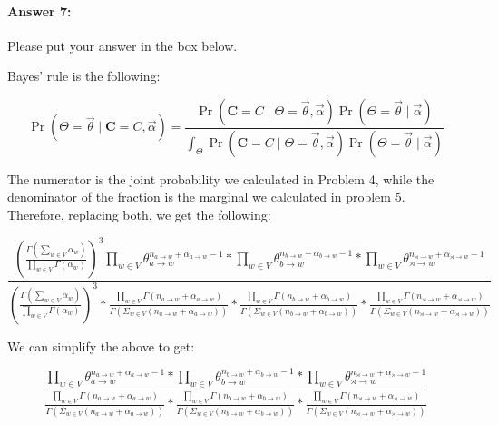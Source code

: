 \documentclass[10pt]{article}
\newenvironment{AnswerBox}{\begin{mdframed}[style=simple]}{\end{mdframed}}
\begin{document}
\paragraph{Answer 7:}  Please put your answer in the box below.


\begin{AnswerBox}%
Bayes' rule is the following:

$$\Pr(\Theta=\vec{\theta} \mid \mathbf{C}=C, \vec{\alpha})=\frac{\Pr(\mathbf{C}=C \mid \Theta=\vec{\theta}, \vec{\alpha})\Pr(\Theta=\vec{\theta}\mid\vec{\alpha})}{\int_{\Theta} \Pr(\mathbf{C}=C \mid \Theta=\vec{\theta},\vec{\alpha})\Pr(\Theta=\vec{\theta}\mid \vec{\alpha})}$$

The numerator is the joint probability we calculated in Problem 4, while the denominator of the fraction is the marginal we calculated in problem 5. Therefore, replacing both, we get the following:

$$
\frac{(\frac{\Gamma(\sum_{w \in V} \alpha_w)}{\prod_{w \in V} \Gamma(\alpha_w)})^3 
\prod _{w \in V} \theta_{a \rightarrow w}^{n_{a \rightarrow w} + \alpha_{a \rightarrow w} -1} *
\prod _{w \in V} \theta_{b \rightarrow w}^{n_{b \rightarrow w} + \alpha_{b \rightarrow w} -1} *
\prod _{w \in V} \theta_{\rtimes \rightarrow w}^{n_{\rtimes \rightarrow w} + \alpha_{\rtimes \rightarrow w} -1}}
{(\frac{\Gamma(\sum_{w \in V} \alpha_w)}{\prod_{w \in V} \Gamma(\alpha_w)})^3 *
\frac{\prod_{w \in V} \Gamma(n_{a \rightarrow w} + \alpha_{a \rightarrow w})}
{\Gamma(\Sigma_{w \in V} (n_{a \rightarrow w} + \alpha_{a \rightarrow w}))} *
\frac{\prod_{w \in V} \Gamma(n_{b \rightarrow w} + \alpha_{b \rightarrow w})}
{\Gamma(\Sigma_{w \in V} (n_{b \rightarrow w} + \alpha_{b \rightarrow w}))} *
\frac{\prod_{w \in V} \Gamma(n_{\rtimes \rightarrow w} + \alpha_{\rtimes \rightarrow w})}
{\Gamma(\Sigma_{w \in V} (n_{\rtimes \rightarrow w} + \alpha_{\rtimes \rightarrow w}))}}
$$

We can simplify the above to get:

$$
\frac{ 
\prod _{w \in V} \theta_{a \rightarrow w}^{n_{a \rightarrow w} + \alpha_{a \rightarrow w} -1} *
\prod _{w \in V} \theta_{b \rightarrow w}^{n_{b \rightarrow w} + \alpha_{b \rightarrow w} -1} *
\prod _{w \in V} \theta_{\rtimes \rightarrow w}^{n_{\rtimes \rightarrow w} + \alpha_{\rtimes \rightarrow w} -1}}
{
\frac{\prod_{w \in V} \Gamma(n_{a \rightarrow w} + \alpha_{a \rightarrow w})}
{\Gamma(\Sigma_{w \in V} (n_{a \rightarrow w} + \alpha_{a \rightarrow w}))} *
\frac{\prod_{w \in V} \Gamma(n_{b \rightarrow w} + \alpha_{b \rightarrow w})}
{\Gamma(\Sigma_{w \in V} (n_{b \rightarrow w} + \alpha_{b \rightarrow w}))} *
\frac{\prod_{w \in V} \Gamma(n_{\rtimes \rightarrow w} + \alpha_{\rtimes \rightarrow w})}
{\Gamma(\Sigma_{w \in V} (n_{\rtimes \rightarrow w} + \alpha_{\rtimes \rightarrow w}))}}
$$

    
\end{AnswerBox}%
\end{document}
